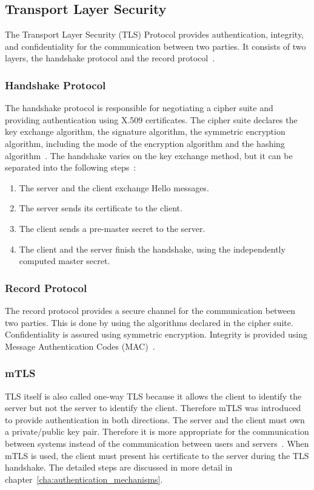 \subsection{Transport Layer Security}
The Transport Layer Security (TLS) Protocol provides authentication, integrity, and confidentiality for the communication between two parties.
It consists of two layers, the handshake protocol and the record protocol~\cite{turnertls}.

\subsubsection{Handshake Protocol}
The handshake protocol is responsible for negotiating a cipher suite and providing authentication using X.509 certificates.
The cipher suite declares the key exchange algorithm, the signature algorithm, the symmetric encryption algorithm, including the mode of the encryption algorithm and the hashing algorithm~\cite{turnertls, kurbatov2021design}.
The handshake varies on the key exchange method, but it can be separated into the following steps~\cite{krawczyk2013security}:
\begin{enumerate}
    \item The server and the client exchange Hello messages.
    \item The server sends its certificate to the client.
    \item The client sends a pre-master secret to the server.
    \item The client and the server finish the handshake, using the independently computed master secret.
\end{enumerate}

\subsubsection{Record Protocol}
The record protocol provides a secure channel for the communication between two parties.
This is done by using the algorithms declared in the cipher suite.
Confidentiality is assured using symmetric encryption.
Integrity is provided using Message Authentication Codes (MAC)~\cite{kurbatov2021design, krawczyk2013security}.

\subsubsection{mTLS} \label{sec:mtls}
TLS itself is also called one-way TLS because it allows the client to identify the server but not the server to identify the client.
Therefore mTLS was introduced to provide authentication in both directions.
The server and the client must own a private/public key pair.
Therefore it is more appropriate for the communication between systems instead of the communication between users and servers~\cite{dias2020microservices}. 
When mTLS is used, the client must present his certificate to the server during the TLS handshake.
The detailed steps are discussed in more detail in chapter~\ref{cha:authentication_mechanisms}.

